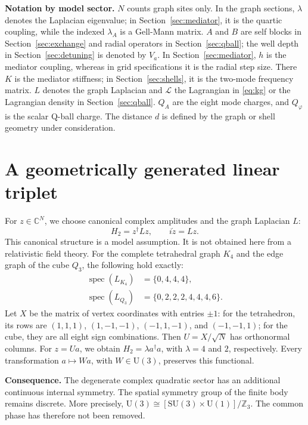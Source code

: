 \documentclass[a4paper,11pt]{article}
\newcommand{\C}{\mathbb C}
\begin{document}
{\small\textbf{Notation by model sector.} $N$ counts graph sites only. In the graph sections, $\lambda$ denotes the Laplacian eigenvalue; in Section~\ref{sec:mediator}, it is the quartic coupling, while the indexed $\lambda_A$ is a Gell-Mann matrix. $A$ and $B$ are self blocks in Section~\ref{sec:exchange} and radial operators in Section~\ref{sec:qball}; the well depth in Section~\ref{sec:detuning} is denoted by $V_a$. In Section~\ref{sec:mediator}, $h$ is the mediator coupling, whereas in grid specifications it is the radial step size. There $K$ is the mediator stiffness; in Section~\ref{sec:shells}, it is the two-mode frequency matrix. $L$ denotes the graph Laplacian and $\mathcal L$ the Lagrangian in \eqref{eq:kg} or the Lagrangian density in Section~\ref{sec:qball}. $Q_A$ are the eight mode charges, and $Q_\varphi$ is the scalar Q-ball charge. The distance $d$ is defined by the graph or shell geometry under consideration.\par}

\section{A geometrically generated linear triplet}\label{sec:linear}
For $z\in\C^N$, we choose canonical complex amplitudes and the graph Laplacian $L$:
\begin{equation}\label{eq:linear}
H_2=z^\dagger Lz,\qquad i\dot z=Lz.
\end{equation}
This canonical structure is a model assumption. It is not obtained here from a relativistic field theory. For the complete tetrahedral graph $K_4$ and the edge graph of the cube $Q_3$, the following hold exactly:
\begin{equation}\label{eq:spectra}
\begin{aligned}
\operatorname{spec}(L_{K_4})&=\{0,4,4,4\},\\
\operatorname{spec}(L_{Q_3})&=\{0,2,2,2,4,4,4,6\}.
\end{aligned}
\end{equation}
Let $X$ be the matrix of vertex coordinates with entries $\pm1$: for the tetrahedron, its rows are $(1,1,1)$, $(1,-1,-1)$, $(-1,1,-1)$, and $(-1,-1,1)$; for the cube, they are all eight sign combinations. Then $U=X/\sqrt N$ has orthonormal columns. For $z=Ua$, we obtain $H_2=\lambda a^\dagger a$, with $\lambda=4$ and $2$, respectively. Every transformation $a\mapsto Wa$, with $W\in\mathrm{U}(3)$, preserves this functional.

\textbf{Consequence.} The degenerate complex quadratic sector has an additional continuous internal symmetry. The spatial symmetry group of the finite body remains discrete. More precisely, $\mathrm{U}(3)\cong[\mathrm{SU}(3)\times\mathrm{U}(1)]/\mathbb Z_3$. The common phase has therefore not been removed.
\end{document}
